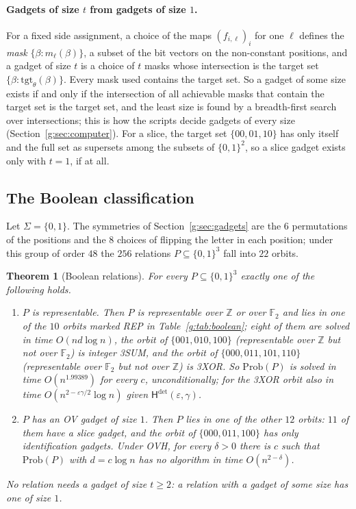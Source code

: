 \documentclass[11pt]{article}
\newtheorem{theorem}{Theorem}[section]
\theoremstyle{definition}
\theoremstyle{remark}
\newcommand{\Z}{\mathbb{Z}}
\newcommand{\F}{\mathbb{F}_2}
\newcommand{\Prob}{\mathrm{Prob}}
\newcommand{\eps}{\varepsilon}
\newcommand{\Hyp}{\mathsf{H}}
\newcommand{\ExpBestUp}{1.99389}%
\begin{document}
\paragraph{Gadgets of size $t$ from gadgets of size $1$.} For a fixed side assignment, a choice of the maps $(f_{i,\ell})_i$ for one $\ell$ defines the \emph{mask} $\{\beta:m_\ell(\beta)\}$, a subset of the bit vectors on the non-constant positions, and a gadget of size $t$ is a choice of $t$ masks whose intersection is the target set $\{\beta:\mathrm{tgt}_\theta(\beta)\}$. Every mask used contains the target set. So a gadget of some size exists if and only if the intersection of all achievable masks that contain the target set is the target set, and the least size is found by a breadth-first search over intersections; this is how the scripts decide gadgets of every size (Section~\ref{g:sec:computer}). For a slice, the target set $\{00,01,10\}$ has only itself and the full set as supersets among the subsets of $\{0,1\}^2$, so a slice gadget exists only with $t=1$, if at all.

\subsection{The Boolean classification}\label{g:sec:boolean}

Let $\Sigma=\{0,1\}$. The symmetries of Section~\ref{g:sec:gadgets} are the $6$ permutations of the positions and the $8$ choices of flipping the letter in each position; under this group of order $48$ the $256$ relations $P\subseteq\{0,1\}^3$ fall into $22$ orbits.

\begin{theorem}[Boolean relations]\label{g:thm:D}
For every $P\subseteq\{0,1\}^3$ exactly one of the following holds.
\begin{enumerate}[label=\textup{(\roman*)}]
\item $P$ is representable. Then $P$ is representable over $\Z$ or over $\F$ and lies in one of the $10$ orbits marked REP in Table~\ref{g:tab:boolean}; eight of them are solved in time $O(nd\log n)$, the orbit of $\{001,010,100\}$ (representable over $\Z$ but not over $\F$) is integer 3SUM, and the orbit of $\{000,011,101,110\}$ (representable over $\F$ but not over $\Z$) is 3XOR. So $\Prob(P)$ is solved in time $O(n^{\ExpBestUp})$ for every $c$, unconditionally; for the 3XOR orbit also in time $O(n^{2-\eps\gamma/2}\log n)$ given $\Hyp^{\det}(\eps,\gamma)$.
\item $P$ has an OV gadget of size $1$. Then $P$ lies in one of the other $12$ orbits: $11$ of them have a slice gadget, and the orbit of $\{000,011,100\}$ has only identification gadgets. Under OVH, for every $\delta>0$ there is $c$ such that $\Prob(P)$ with $d=c\log n$ has no algorithm in time $O(n^{2-\delta})$.
\end{enumerate}
No relation needs a gadget of size $t\ge2$: a relation with a gadget of some size has one of size $1$.
\end{theorem}
\end{document}
